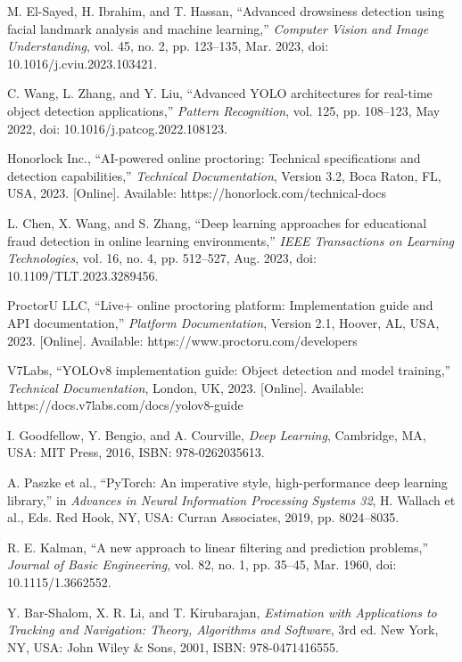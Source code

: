 \documentclass[conference]{IEEEtran}
\begin{document}
\begin{thebibliography}{99}
M. El-Sayed, H. Ibrahim, and T. Hassan, ``Advanced drowsiness detection using facial landmark analysis and machine learning,'' \textit{Computer Vision and Image Understanding}, vol. 45, no. 2, pp. 123--135, Mar. 2023, doi: 10.1016/j.cviu.2023.103421.

C. Wang, L. Zhang, and Y. Liu, ``Advanced YOLO architectures for real-time object detection applications,'' \textit{Pattern Recognition}, vol. 125, pp. 108--123, May 2022, doi: 10.1016/j.patcog.2022.108123.

Honorlock Inc., ``AI-powered online proctoring: Technical specifications and detection capabilities,'' \textit{Technical Documentation}, Version 3.2, Boca Raton, FL, USA, 2023. [Online]. Available: https://honorlock.com/technical-docs

L. Chen, X. Wang, and S. Zhang, ``Deep learning approaches for educational fraud detection in online learning environments,'' \textit{IEEE Transactions on Learning Technologies}, vol. 16, no. 4, pp. 512--527, Aug. 2023, doi: 10.1109/TLT.2023.3289456.

ProctorU LLC, ``Live+ online proctoring platform: Implementation guide and API documentation,'' \textit{Platform Documentation}, Version 2.1, Hoover, AL, USA, 2023. [Online]. Available: https://www.proctoru.com/developers

V7Labs, ``YOLOv8 implementation guide: Object detection and model training,'' \textit{Technical Documentation}, London, UK, 2023. [Online]. Available: https://docs.v7labs.com/docs/yolov8-guide

I. Goodfellow, Y. Bengio, and A. Courville, \textit{Deep Learning}, Cambridge, MA, USA: MIT Press, 2016, ISBN: 978-0262035613.

A. Paszke et al., ``PyTorch: An imperative style, high-performance deep learning library,'' in \textit{Advances in Neural Information Processing Systems 32}, H. Wallach et al., Eds. Red Hook, NY, USA: Curran Associates, 2019, pp. 8024--8035.

R. E. Kalman, ``A new approach to linear filtering and prediction problems,'' \textit{Journal of Basic Engineering}, vol. 82, no. 1, pp. 35--45, Mar. 1960, doi: 10.1115/1.3662552.

Y. Bar-Shalom, X. R. Li, and T. Kirubarajan, \textit{Estimation with Applications to Tracking and Navigation: Theory, Algorithms and Software}, 3rd ed. New York, NY, USA: John Wiley \& Sons, 2001, ISBN: 978-0471416555.


\end{thebibliography}
\end{document}
